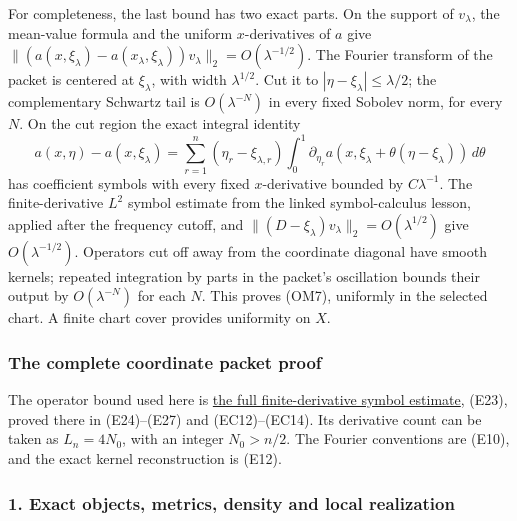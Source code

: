 \documentclass[
  11pt,
]{article}
\makeatletter
\let\ReaderOriginalAnchorStart\hyper@anchorstart
\let\ReaderOriginalAnchorEnd\hyper@anchorend
\let\ReaderPendingAliases\@empty
\def\ReaderArmAliases#1{\gdef\ReaderPendingAliases{#1}}
\def\hyper@anchorstart#1{\ReaderIfNativeAnchorTF{#1}{\ReaderPendingAliases\global\let\ReaderPendingAliases\@empty}{}\ReaderOriginalAnchorStart{#1}}
\makeatother
\begin{document}
For completeness, the last bound has two exact parts. On the support of
\(v_\lambda\), the mean-value formula and the uniform \(x\)-derivatives
of \(a\) give
\(\|(a(x,\xi_\lambda)-a(x_\lambda,\xi_\lambda))v_\lambda\|_2
 =O(\lambda^{-1/2})\). The Fourier transform of the packet is centered
at \(\xi_\lambda\), with width \(\lambda^{1/2}\). Cut it to
\(|\eta-\xi_\lambda|\le\lambda/2\); the complementary Schwartz tail is
\(O(\lambda^{-N})\) in every fixed Sobolev norm, for every \(N\). On the
cut region the exact integral identity \[
 a(x,\eta)-a(x,\xi_\lambda)
 =\sum_{r=1}^n(\eta_r-\xi_{\lambda,r})
   \int_0^1\partial_{\eta_r}a
       (x,\xi_\lambda+\theta(\eta-\xi_\lambda))\,d\theta
 \tag{OM8}
\] has coefficient symbols with every fixed \(x\)-derivative bounded by
\(C\lambda^{-1}\). The finite-derivative \(L^2\) symbol estimate from
the linked symbol-calculus lesson, applied after the frequency cutoff,
and \(\|(D-\xi_\lambda)v_\lambda\|_2=O(\lambda^{1/2})\) give
\(O(\lambda^{-1/2})\). Operators cut off away from the coordinate
diagonal have smooth kernels; repeated integration by parts in the
packet's oscillation bounds their output by \(O(\lambda^{-N})\) for each
\(N\). This proves (OM7), uniformly in the selected chart. A finite
chart cover provides uniformity on \(X\).

\ReaderArmAliases{\ReaderOriginalAnchorStart{the-complete-coordinate-packet-proof}\ReaderOriginalAnchorEnd}
\subsubsection{The complete coordinate packet
proof}\label{the-complete-coordinate-packet-proof}

The operator bound used here is \href{euclidean-symbol-calculus.pdf}{the
full finite-derivative symbol estimate}, (E23), proved there in
(E24)--(E27) and (EC12)--(EC14). Its derivative count can be taken as
\(L_n=4N_0\), with an integer \(N_0>n/2\). The Fourier conventions are
(E10), and the exact kernel reconstruction is (E12).

\ReaderArmAliases{\ReaderOriginalAnchorStart{1-exact-objects-metrics-density-and-local-realization}\ReaderOriginalAnchorEnd\begingroup\expandafter\def\csname @currentHref\endcsname{1-exact-objects-metrics-density-and-local-realization}\label{1-exact-objects-metrics-density-and-local-realization}\endgroup}
\subsubsection{1. Exact objects, metrics, density and local
realization}\label{exact-objects-metrics-density-and-local-realization}
\end{document}
